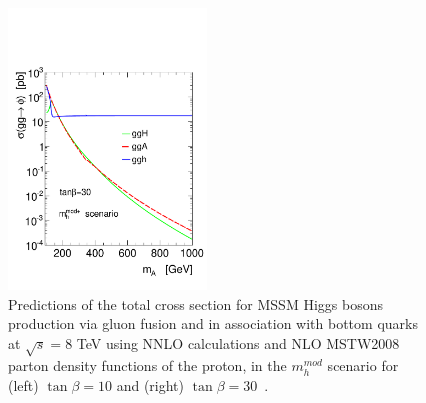 \begin{figure}[tp]
\begin{center}
            \includegraphics[width=0.47\textwidth]{figure/ggA30.pdf}

    \end{center}
    \caption{Predictions of the total cross section for MSSM Higgs bosons production  via gluon fusion and in association with
	bottom quarks  at $\sqrt{s} = 8$ TeV using NNLO calculations and NLO MSTW2008 
	parton density functions of the proton, in the   $m_h^{mod}$ scenario for (left) $\tan\beta  = 10$ and 
	(right) $\tan\beta  = 30$~\cite{LHCxsec1}.
	 }

   \label{fig:xsec}
\end{figure}


